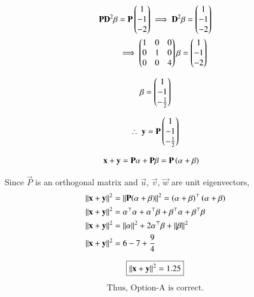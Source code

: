 \documentclass[journal]{IEEEtran}
\begin{document}
\begin{align}
\mathbf{P}\mathbf{D}^2\mathbf{\beta} &= \mathbf{P} \begin{pmatrix}1 \\ -1 \\ -2\end{pmatrix} \implies \mathbf{D}^2\mathbf{\beta} = \begin{pmatrix}1 \\ -1 \\ -2\end{pmatrix} \\
&\implies \begin{pmatrix}1 & 0 & 0 \\ 0 & 1 & 0 \\ 0 & 0 & 4\end{pmatrix} \mathbf{\beta} = \begin{pmatrix}1 \\ -1 \\ -2\end{pmatrix}
\end{align}


\begin{equation}
\mathbf{\beta} = \begin{pmatrix}1 \\ -1 \\ -\frac{1}{2}\end{pmatrix}
\end{equation}

\begin{equation}
\therefore \; \mathbf{y} = \mathbf{P} \begin{pmatrix}1 \\ -1 \\ -\frac{1}{2}\end{pmatrix}
\end{equation}


\begin{align}
\mathbf{x} + \mathbf{y} &= \mathbf{P}\mathbf{\alpha} + \mathbf{P}\mathbf{\beta} = \mathbf{P}\left(\mathbf{\alpha} + \mathbf{\beta}\right)
\end{align}

Since $\vec{P}$ is an orthogonal matrix and $\vec{u}, \, \vec{v}, \, \vec{w}$ are unit eigenvectors,
\begin{align}
\left\lVert\mathbf{x} + \mathbf{y}\right\rVert^2 &= \left\lVert\mathbf{P}(\mathbf{\alpha} + \mathbf{\beta})\right\rVert^2 = \left( \mathbf{\alpha} + \mathbf{\beta}\right)^\top (\mathbf{\alpha} + \mathbf{\beta})\\
\left\lVert\mathbf{x} + \mathbf{y}\right\rVert^2 &=  \mathbf{\alpha}^\top\mathbf{\alpha} + \mathbf{\alpha}^\top\mathbf{\beta} + \mathbf{\beta}^\top\mathbf{\alpha} + \mathbf{\beta}^\top\mathbf{\beta}\\
\left\lVert\mathbf{x} + \mathbf{y}\right\rVert^2 &= \left\lVert\mathbf{\alpha}\right\rVert^2 + 2\mathbf{\alpha}^\top\mathbf{\beta} +
\left\lVert\mathbf{\beta}\right\rVert^2\\
\left\lVert\mathbf{x} + \mathbf{y}\right\rVert^2 &= 6 - 7 + \dfrac{9}{4}
\end{align}

\begin{align*}
    \boxed{\left\lVert\mathbf{x} + \mathbf{y}\right\rVert^2 = 1.25}
\end{align*}

\begin{equation}
\boxed{\text{Thus, Option-A is correct.}}
\end{equation}
\end{document}
